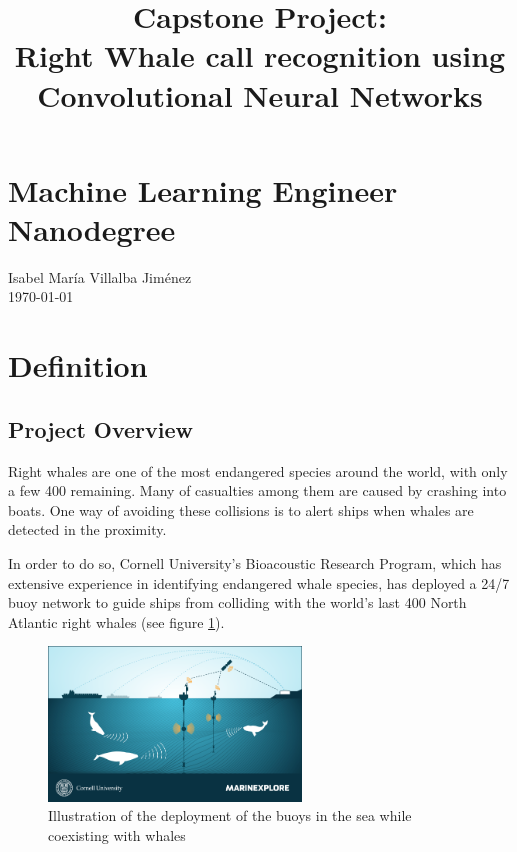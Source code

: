 \documentclass[]{article}
\author{}
\date{}
\title{Capstone Project: \\ Right Whale call recognition using \\ Convolutional Neural Networks}\label{capstone-project}
\begin{document}
\maketitle

\section*{Machine Learning Engineer Nanodegree}\label{machine-learning-engineer-nanodegree}

Isabel María Villalba Jiménez \\ \today

\section{Definition}\label{i.-definition}

\subsection{Project Overview}\label{project-overview}


Right whales are one of the most endangered species around the world, with only a few 400 remaining. Many of casualties among them are caused by crashing into boats. One way of avoiding these collisions is to alert ships when whales are detected in the proximity.

In order to do so, Cornell University's Bioacoustic Research Program, which has extensive experience in identifying endangered whale species, has deployed a 24/7 buoy network to guide ships from colliding with the world's last 400 North Atlantic right whales (see figure \ref{img:setup}).

\begin{figure}[htpb!]
\centering
\includegraphics[width= 0.6\textwidth]{images/kaggle_whale_detection_3.png}
\caption{Illustration of the deployment of the buoys in the sea while coexisting with whales \cite{kagglewhale} \label{img:setup}}
\end{figure}  
\end{document}
